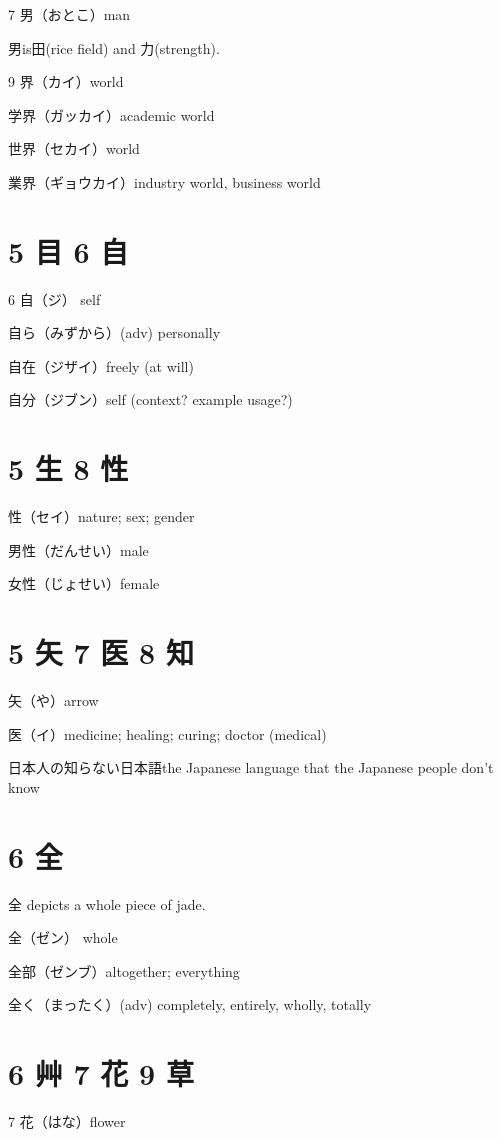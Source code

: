 7 男（おとこ）man

男is田(rice field) and 力(strength).

9 界（カイ）world

学界（ガッカイ）academic world

世界（セカイ）world

業界（ギョウカイ）industry world, business world

\section{5 目 6 自}

6 自（ジ） self

自ら（みずから）(adv) personally

自在（ジザイ）freely (at will)

自分（ジブン）self (context? example usage?)

\section{5 生 8 性}

性（セイ）nature; sex; gender

男性（だんせい）male

女性（じょせい）female

\section{5 矢 7 医 8 知}

矢（や）arrow

医（イ）medicine; healing; curing; doctor (medical)

日本人の知らない日本語the Japanese language that the Japanese people don't know

\section{6 全}

全 depicts a whole piece of jade.

全（ゼン） whole

全部（ゼンブ）altogether; everything

全く（まったく）(adv) completely, entirely, wholly, totally

\section{6 艸 7 花 9 草}

7 花（はな）flower

